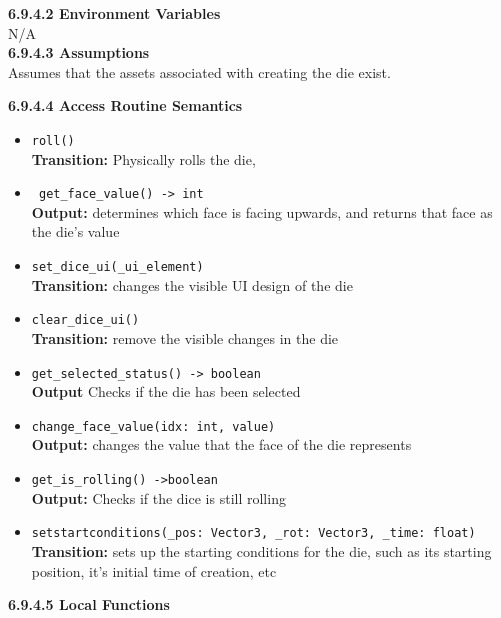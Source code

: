 \documentclass[12pt, titlepage]{article}
\begin{document}
\textbf{6.9.4.2 Environment Variables}\\

N/A\\


\textbf{6.9.4.3 Assumptions}\\
Assumes that the assets associated with creating the die exist. 

\textbf{6.9.4.4 Access Routine Semantics}
\begin{itemize}
	\item \texttt{roll() }\\
	\textbf{Transition:} Physically rolls the die, 
	
	\item \texttt{ get\_face\_value() -> int }\\
	\textbf{Output:} determines which face is facing upwards, and returns that face as the die's value
	
	\item \texttt{set\_dice\_ui(\_ui\_element) }\\
	\textbf{Transition:} changes the visible UI design of the die
	
	\item \texttt{clear\_dice\_ui() }\\
	\textbf{Transition:} remove the visible changes in the die
	
	\item \texttt{get\_selected\_status() -> boolean}\\
	\textbf{Output} Checks if the die has been selected
	
	\item \texttt{change\_face\_value(idx: int, value) }\\
	\textbf{Output:} changes the value that the face of the die represents
	
	\item \texttt{get\_is\_rolling() ->boolean }\\
	\textbf{Output:} Checks if the dice is still rolling
	
	\item \texttt{setstartconditions(\_pos: Vector3, \_rot: Vector3, \_time: float) }\\
	\textbf{Transition:} sets up the starting conditions for the die, such as its starting position, it's initial time of creation, etc
	


\end{itemize}

\textbf{6.9.4.5 Local Functions}
\end{document}
